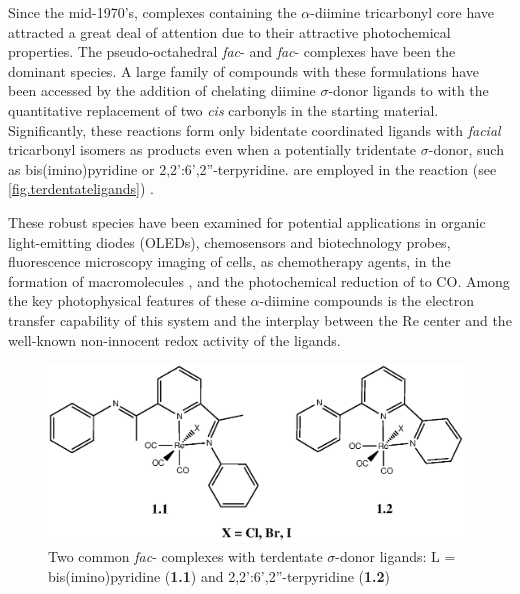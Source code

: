 Since the mid-1970's, complexes containing the $\alpha$-diimine  tricarbonyl core have attracted a great deal of attention due to their attractive photochemical properties. The pseudo-octahedral \textit{fac}-\ce{[L2Re(CO)3X]} and \textit{fac}-\ce{[L2(L$'$)Re(CO)3]+} complexes have been the dominant species\autocite{giordano1979, fredericks1979, sacksteder1990, caspar1983, yam2001, feliz1998, ruiz1996, lin1992, hino1992, walters2002, striplin2001}. A large family of compounds with these formulations have been accessed by the addition of chelating diimine $\sigma$-donor ligands to \ce{[Re(CO)5X]} with the quantitative replacement of two \textit{cis} carbonyls in the  starting material\autocite{giordano1979, martin2011, abel1959, kirkham1965, zingales1967, gamelin1994, marti2005, morse1976, ge2009, giordano1978}. Significantly, these reactions form only bidentate coordinated ligands with \textit{facial} tricarbonyl isomers as products even when a potentially tridentate $\sigma$-donor, such as bis(imino)pyridine or 2,2':6',2''-terpyridine. are employed in the reaction (see \autoref{fig.terdentateligands}) \autocite{granifo1999, orrell1997, abel1993, potgieter2013}. 

These robust species have been examined for potential applications in organic light-emitting diodes (OLEDs)\autocite{gong1998, yu2013}, chemosensors and biotechnology probes\autocite{lo2010, lin2007, slone1995, beer1999, beer2003}, fluorescence microscopy imaging of cells\autocite{lo2010, amoroso2008, amoroso2007, schutte2011, shestopalov2014}, as chemotherapy agents\autocite{gimeno2014}, in the formation of macromolecules \autocite{constable1992}, and the photochemical reduction of  to CO\autocite{hawecker1983, hawecker1986, takeda2010, christensen1992, sullivan1985}. Among the key photophysical features of these $\alpha$-diimine  compounds is the electron transfer capability of this system and the interplay between the Re center and the well-known non-innocent redox activity of the ligands\autocite{caulton2012, lyaskovskyy2012}.

\begin{figure}[!htbp]
 \begin{center}
  \includegraphics[clip=true, width=110mm]{images/terdentateligands.eps}
 \end{center}
\caption[Two common bidentate complexes using terdentate ligands]{Two common \textit{fac}-\ce{[L2Re(CO)3X]} complexes with terdentate $\sigma$-donor ligands: L = bis(imino)pyridine (\textbf{1.1}) and 2,2':6',2''-terpyridine (\textbf{1.2})}
\label{fig.terdentateligands}
\end{figure}

